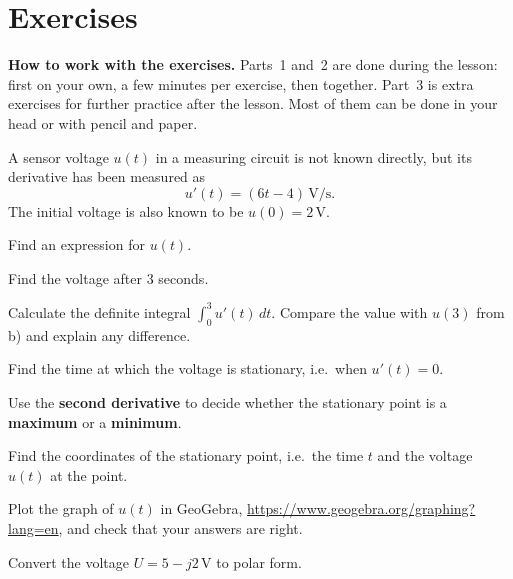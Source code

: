 
\section{Exercises}
\label{c15:sec:uppgifter}

\begin{aside}
\textbf{How to work with the exercises.} Parts~1 and~2 are done during the lesson: first on your
own, a few minutes per exercise, then together. Part~3 is extra exercises for further practice
after the lesson. Most of them can be done in your head or with pencil and paper.

\end{aside}


A sensor voltage $u(t)$ in a measuring circuit is not known directly, but its derivative has been
measured as
\[
  u'(t) = (6t - 4)\,\text{V/s}.
\]
The initial voltage is also known to be $u(0) = 2\,\text{V}$.
\begin{parts}
  \item Find an expression for $u(t)$.
  \item Find the voltage after $3$ seconds.
  \item Calculate the definite integral $\int_0^3 u'(t)\,dt$. Compare the value with $u(3)$ from
    b) and explain any difference.
  \item Find the time at which the voltage is stationary, i.e.\ when $u'(t) = 0$.
  \item Use the \textbf{second derivative} to decide whether the stationary point is a
    \textbf{maximum} or a \textbf{minimum}.
  \item Find the coordinates of the stationary point, i.e.\ the time $t$ and the voltage $u(t)$
    at the point.
  \item Plot the graph of $u(t)$ in GeoGebra, \url{https://www.geogebra.org/graphing?lang=en}, and
    check that your answers are right.
\end{parts}


Convert the voltage $U = 5 - j2\,\text{V}$ to polar form.

